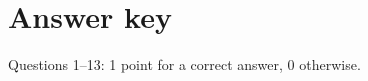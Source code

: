 \documentclass[a4paper]{article}
\begin{document}
\begin{enumerate}






\end{enumerate}

\ifdefined\showsolutions
\newpage
{}
\section*{Answer key}
\noindent Questions 1--13: 1 point for a correct answer, 0 otherwise.
\end{document}
